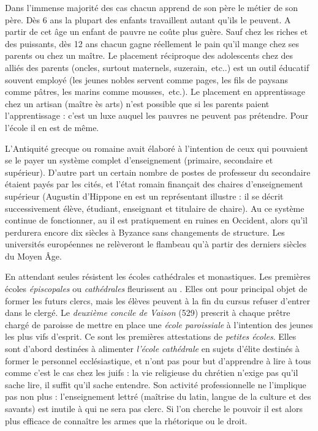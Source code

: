  Dans l'immense majorité des cas chacun apprend de son père le métier de son père. Dès 6 ans la plupart des enfants travaillent autant qu'ils le peuvent. A partir de cet âge un enfant de pauvre ne coûte plus guère. Sauf chez les riches et des puissants, dès 12 ans chacun gagne réellement le pain qu'il mange chez ses parents ou chez un maître. Le placement réciproque des adolescents chez des alliés des parents (oncles, surtout maternels, suzerain,~etc..) est un outil éducatif souvent employé (les jeunes nobles servent comme pages, les fils de paysans comme pâtres, les marins comme mousses,~etc.). Le placement en apprentissage chez un artisan (maître ès arts) n'est possible que si les parents paient l'apprentissage : c'est un luxe auquel les pauvres ne peuvent pas prétendre. Pour l'école il en est de même. 

 L'Antiquité grecque ou romaine avait élaboré à l'intention de ceux qui pouvaient se le payer un système complet d'enseignement (primaire, secondaire et supérieur). D'autre part un certain nombre de postes de professeur du secondaire étaient payés par les cités, et l'état romain finançait des chaires d'enseignement supérieur (Augustin d'Hippone en est un représentant illustre : il se décrit successivement élève, étudiant, enseignant et titulaire de chaire). Au  ce système continue de fonctionner, au  il est pratiquement en ruines en Occident, alors qu'il perdurera encore dix siècles à Byzance sans changements de structure. Les universités européennes ne relèveront le flambeau qu'à partir des derniers siècles du Moyen Âge. 

 En attendant seules résistent les écoles cathédrales et monastiques. Les premières écoles \emph{épiscopales} ou \emph{cathédrales} fleurissent au . Elles ont pour principal objet de former les futurs clercs, mais les élèves peuvent à la fin du cursus refuser d'entrer dans le clergé. Le \emph{deuxième concile de Vaison} (529) prescrit à chaque prêtre chargé de paroisse de mettre en place une \emph{école paroissiale} à l'intention des jeunes les plus vifs d'esprit. Ce sont les premières attestations de \emph{petites écoles}. Elles sont d'abord destinées à alimenter \emph{l'école cathédrale} en sujets d'élite destinés à former le personnel ecclésiastique, et n'ont pas pour but d'apprendre à lire à tous comme c'est le cas chez les juifs : la vie religieuse du chrétien n'exige pas qu'il sache lire, il suffit qu'il sache entendre. Son activité professionnelle ne l'implique pas non plus : l'enseignement lettré (maîtrise du latin, langue de la culture et des savants) est inutile à qui ne sera pas clerc. Si l'on cherche le pouvoir il est alors plus efficace de connaître les armes que la rhétorique ou le droit. 
 
